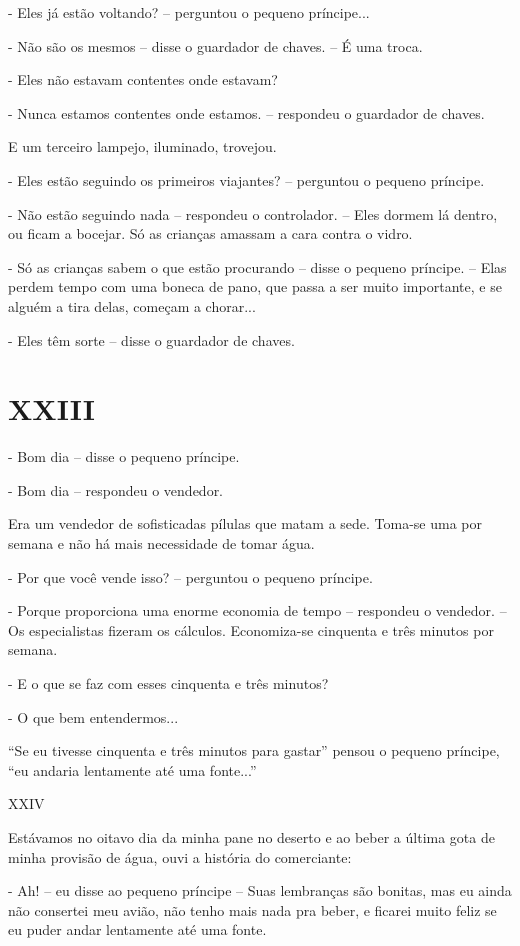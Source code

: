 - Eles já estão voltando? -- perguntou o pequeno príncipe...

- Não são os mesmos -- disse o guardador de chaves. -- É uma troca.

- Eles não estavam contentes onde estavam?

- Nunca estamos contentes onde estamos. -- respondeu o guardador de
chaves.

E um terceiro lampejo, iluminado, trovejou.

- Eles estão seguindo os primeiros viajantes? -- perguntou o pequeno
príncipe.

- Não estão seguindo nada -- respondeu o controlador. -- Eles dormem lá
dentro, ou ficam a bocejar. Só as crianças amassam a cara contra o
vidro.

- Só as crianças sabem o que estão procurando -- disse o pequeno
príncipe. -- Elas perdem tempo com uma boneca de pano, que passa a ser
muito importante, e se alguém a tira delas, começam a chorar...

- Eles têm sorte -- disse o guardador de chaves.

\chapter{XXIII}

- Bom dia -- disse o pequeno príncipe.

- Bom dia -- respondeu o vendedor.

Era um vendedor de sofisticadas pílulas que matam a sede. Toma-se uma
por semana e não há mais necessidade de tomar água.

- Por que você vende isso? -- perguntou o pequeno príncipe.

- Porque proporciona uma enorme economia de tempo -- respondeu o
vendedor. -- Os especialistas fizeram os cálculos. Economiza-se
cinquenta e três minutos por semana.

- E o que se faz com esses cinquenta e três minutos?

- O que bem entendermos...

``Se eu tivesse cinquenta e três minutos para gastar'' pensou o pequeno
príncipe, ``eu andaria lentamente até uma fonte...''

XXIV

Estávamos no oitavo dia da minha pane no deserto e ao beber a última
gota de minha provisão de água, ouvi a história do comerciante:

- Ah! -- eu disse ao pequeno príncipe -- Suas lembranças são bonitas,
mas eu ainda não consertei meu avião, não tenho mais nada pra beber, e
ficarei muito feliz se eu puder andar lentamente até uma fonte.

